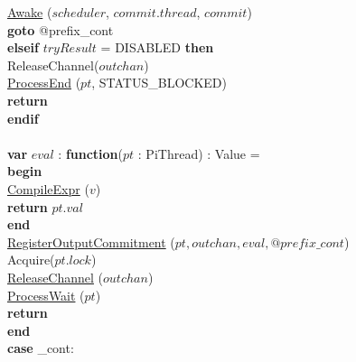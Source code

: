 \documentclass[a4paper,11pt]{article}
\newenvironment{program}{
  \begin{sffamily}
  \begin{scriptsize}
  \begin{tabbing}}
 {\end{tabbing}
  \end{scriptsize}
  \end{sffamily}}
\newcommand{\kw}[1]{\textsf{\textbf{#1}}}
\newcommand{\pindent}{\hspace{2em}\=}
\newcommand{\compiletime}[1]{\textcolor{compilecolor}{#1}}
\newcommand{\synchro}[1]{\textcolor{synchrocolor}{#1}}
\newcommand{\myref}[1]{
  \hyperref[#1]{#1}
}
\begin{document}
\begin{program}
  \>\>\myref{Awake}($scheduler$, $commit.thread$, $commit$) \\
  \>\>\kw{goto} @prefix\_cont \\
 \> \kw{elseif} $tryResult$ = DISABLED \kw{then} \\
 \> \> \synchro{ReleaseChannel($outchan$)} \\
 \> \> \myref{ProcessEnd}($pt$, STATUS\_BLOCKED) \\
 \> \> \kw{return} \\
 \> \kw{endif}\\
\\
  \>\kw{var} $eval$ : \kw{function}($pt$ : PiThread) : Value = \\
  \>\pindent\kw{begin} \\
  \>\>\pindent\compiletime{\myref{CompileExpr}($v$)} \\
  \>\>\>\kw{return} $pt.val$ \\
  \>\> \kw{end} \\
  \> \myref{RegisterOutputCommitment}($pt, outchan, eval, @prefix\_cont$) \\
  \>\synchro{Acquire($pt.lock$)} \\
  \>\synchro{\myref{ReleaseChannel}($outchan$)} \\
  \>\synchro{\myref{ProcessWait}($pt$)} \\
  \>\kw{return} \\
  \kw{end} \\
 \kw{case} \@prefix\_cont:
\end{program}
\end{document}
